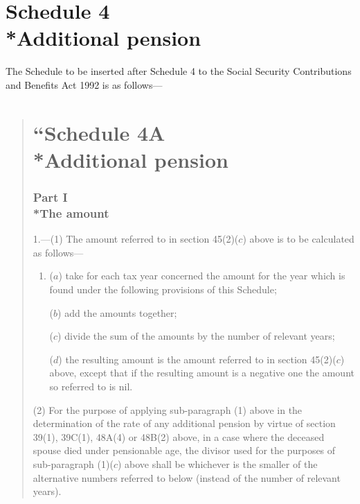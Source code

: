 \documentclass[12pt,a4paper]{article}
\begin{document}

\part[Schedule 4 --- Additional pension]{Schedule 4\\*Additional pension}

\renewcommand\parthead{--- Schedule 4}

\noindent
The Schedule to be inserted after Schedule 4 to the Social Security Contributions and Benefits Act 1992 is as follows—
\begin{quotation}
\part*{\noindent “Schedule 4A\\*Additional pension}

\section*{Part I\\*The amount}

1.---(1) The amount referred to in section 45(2)($c$)  above is to be calculated as follows—
\begin{enumerate}\item[]
($a$) take for each tax year concerned the amount for the year which is found under the following provisions of this Schedule;

($b$) add the amounts together;

($c$) divide the sum of the amounts by the number of relevant years;

($d$) the resulting amount is the amount referred to in section 45(2)($c$)  above, except that if the resulting amount is a negative one the amount so referred to is nil.
\end{enumerate}

(2) For the purpose of applying sub-paragraph (1)  above in the determination of the rate of any additional pension by virtue of section 39(1), 39C(1), 48A(4)  or 48B(2)  above, in a case where the deceased spouse died under pensionable age, the divisor used for the purposes of sub-paragraph (1)($c$)  above shall be whichever is the smaller of the alternative numbers referred to below (instead of the number of relevant years).


\end{quotation}
\end{document}
